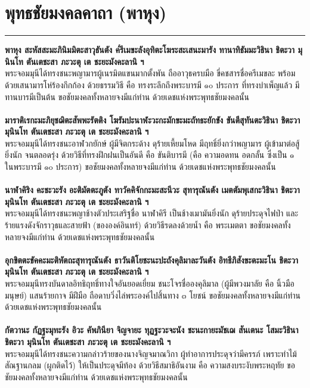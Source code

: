 \documentclass[12pt]{article}
\begin{document}
\pagebreak
\section{พุทธชัยมงคลคาถา (พาหุง)}
\hrule
\textbf{พาหุง สะหัสสะมะภินิมมิตะสาวุธันตัง ค๎รีเมขะลังอุทิตะโฆระสะเสนะมารัง ทานาทิธัมมะวิธินา ชิตะวา มุนินโท ตันเตชะสา ภะวะตุ เต ชะยะมังคะลานิ ฯ}\\
พระจอมมุนีได้ทรงชนะพญามารผู้เนรมิตแขนมากตั้งพัน ถืออาวุธครบมือ ขี่คชสารชื่อครีเมขละ พร้อมด้วยเสนามารโห่ร้องกึกก้อง ด้วยธรรมวิธี คือ ทรงระลึกถึงพระบารมี ๑๐ ประการ ที่ทรงบำเพ็ญแล้ว มีทานบารมีเป็นต้น ขอชัยมงคลทั้งหลายจงมีแก่ท่าน ด้วยเดชแห่งพระพุทธชัยมงคลนั้น\\\\
\textbf{มาราติเรกะมะภิยุชฌิตะสัพพะรัตติง โฆรัมปะนาฬะวะกะมักขะมะถัทธะยักขัง ขันตีสุทันตะวิธินา ชิตะวา มุนินโท ตันเตชะสา ภะวะตุ เต ชะยะมังคะลานิ ฯ}\\
พระจอมมุนีได้ทรงชนะอาฬวกยักษ์ ผู้มีจิตกระด้าง ดุร้ายเหี้ยมโหด มีฤทธิ์ยิ่งกว่าพญามาร ผู้เข้ามาต่อสู้ยิ่งนัก จนตลอดรุ่ง ด้วยวิธีที่ทรงฝึกฝนเป็นอันดี คือ ขันติบารมี (คือ ความอดทน อดกลั้น ซึ่งเป็น ๑ ในพระบารมี ๑๐ ประการ) ขอชัยมงคลทั้งหลายจงมีแก่ท่าน ด้วยเดชแห่งพระพุทธชัยมงคลนั้น\\\\
\textbf{นาฬาคิริง คะชะวะรัง อะติมัตตะภูตัง ทาวัคคิจักกะมะสะนีวะ สุทารุณันตัง เมตตัมพุเสกะวิธินา ชิตะวา มุนินโท ตันเตชะสา ภะวะตุ เต ชะยะมังคะลานิ ฯ}\\
พระจอมมุนีได้ทรงชนะพญาช้างตัวประเสริฐชื่อ นาฬาคิรี เป็นช้างเมามันยิ่งนัก ดุร้ายประดุจไฟป่า และร้ายแรงดังจักราวุธและสายฟ้า (ขององค์อินทร์) ด้วยวิธีรดลงด้วยน้ำ คือ พระเมตตา ขอชัยมงคลทั้งหลายจงมีแก่ท่าน ด้วยเดชแห่งพระพุทธชัยมงคลนั้น\\\\
\textbf{อุกขิตตะขัคคะมะติหัตถะสุทารุณันตัง ธาวันติโยชะนะปะถังคุลิมาละวันตัง อิทธีภิสังขะตะมะโน ชิตะวา มุนินโท ตันเตชะสา ภะวะตุ เต ชะยะมังคะลานิ ฯ}\\
พระจอมมุนีทรงบันดาลอิทธิฤทธิ์ทางใจอันยอดเยี่ยม ชนะโจรชื่อองคุลิมาล (ผู้มีพวงมาลัย คือ นิ้วมือมนุษย์) แสนร้ายกาจ มีฝีมือ ถือดาบวิ่งไล่พระองค์ไปสิ้นทาง ๓ โยชน์ ขอชัยมงคลทั้งหลายจงมีแก่ท่าน ด้วยเดชแห่งพระพุทธชัยมงคลนั้น\\\\
\textbf{กัตวานะ กัฏฐะมุทะรัง อิวะ คัพภินียา จิญจายะ ทุฏฐะวะจะนัง ชะนะกายะมัชเฌ สันเตนะ โสมะวิธินา ชิตะวา มุนินโท ตันเตชะสา ภะวะตุ เต ชะยะมังคะลานิ ฯ}\\
พระจอมมุนีได้ทรงชนะความกล่าวร้ายของนางจิญจมาณวิกา ผู้ทำอาการประดุจว่ามีครรภ์ เพราะทำไม้สัณฐานกลม (ผูกติดไว้) ให้เป็นประดุจมีท้อง ด้วยวิธีสมาธิอันงาม คือ ความสงบระงับพระหฤทัย ขอชัยมงคลทั้งหลายจงมีแก่ท่าน ด้วยเดชแห่งพระพุทธชัยมงคลนั้น\\\\
\end{document}

